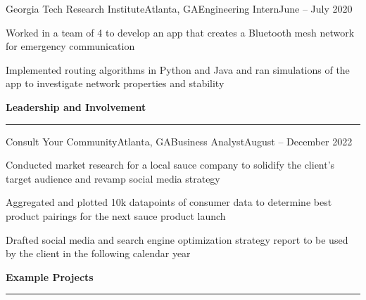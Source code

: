 \documentclass{article}
\newcommand{\horizontal}{\vspace{3pt}\hrule}
\newcommand{\sectitle}[1]{\vspace{3pt} \textbf{\large #1} \horizontal}
\begin{document}
\begin{flushleft}
    \begin{experience}{Georgia Tech Research Institute}{Atlanta, GA}{Engineering Intern}{June -- July 2020}
        \item Worked in a team of 4 to develop an app that creates a Bluetooth mesh network for emergency communication
        \item Implemented routing algorithms in Python and Java and ran simulations of the app to investigate network properties and stability
    \end{experience}


\sectitle{Leadership and Involvement}


    \begin{experience}{Consult Your Community}{Atlanta, GA}{Business Analyst}{August -- December 2022}
        \item Conducted market research for a local sauce company to solidify the client's target audience and revamp social media strategy
        \item Aggregated and plotted 10k datapoints of consumer data to determine best product pairings for the next sauce product launch
        \item Drafted social media and search engine optimization strategy report to be used by the client in the following calendar year
    \end{experience}

\sectitle{Example Projects}

    \vspace{3pt}


\end{flushleft}
\end{document}
